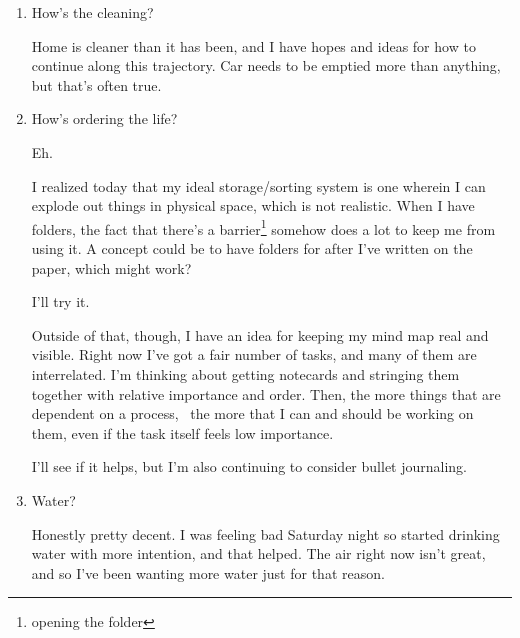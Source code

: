 \documentclass[12pt]{article}
\renewcommand{\,}{\textsuperscript{,}}
\begin{document}
\begin{enumerate}
\item How's the cleaning?

Home is cleaner than it has been, and I have hopes and ideas for how to continue along this trajectory.  
Car needs to be emptied more than anything, but that's often true.

\item How's ordering the life?

Eh.

I realized today that my ideal storage/sorting system is one wherein I can explode out things in physical space, which is not realistic.  
When I have folders, the fact that there's a barrier\footnote{opening the folder} somehow does a lot to keep me from using it.  
A concept could be to have folders for after I've written on the paper, which might work?

I'll try it.

Outside of that, though, I have an idea for keeping my mind map real and visible.  
Right now I've got a fair number of tasks, and many of them are interrelated.  
I'm thinking about getting notecards and stringing them together with relative importance and order.  
Then, the more things that are dependent on a process,  the more that I can and should be working on them, even if the task itself feels low importance.

I'll see if it helps, but I'm also continuing to consider bullet journaling.

\item Water?

Honestly pretty decent.  
I was feeling bad Saturday night so started drinking water with more intention, and that helped.  
The air right now isn't great, and so I've been wanting more water just for that reason.

\end{enumerate}
\end{document}
